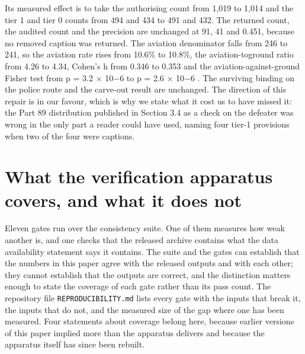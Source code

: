 Its measured effect is to take the authorising count from 1,019 to 1,014 and the tier 1 and tier 0 counts from 494 and 434 to 491 and 432. The returned count, the audited count and the precision are unchanged at 91, 41 and 0.451, because no removed caption was returned. The aviation denominator falls from 246 to 241, so the aviation rate rises from 10.6\% to 10.8\%, the aviation-toground ratio from 4.26 to 4.34, Cohen's h from 0.346 to 0.353 and the aviation-against-ground Fisher test from p = 3.2 $\times$ 10$-$6 to p = 2.6 $\times$ 10$-$6 . The surviving binding on the police route and the carve-out result are unchanged. The direction of this repair is in our favour, which is why we state what it cost us to have missed it: the Part 89 distribution published in Section 3.4 as a check on the defeater was wrong in the only part a reader could have used, naming four tier-1 provisions when two of the four were captions.

\section{What the verification apparatus covers, and what it does not}\label{app:gates}

Eleven gates run over the consistency suite. One of them measures how weak another is, and one checks that the released archive contains what the data availability statement says it contains. The suite and the gates can establish that the numbers in this paper agree with the released outputs and with each other; they cannot establish that the outputs are correct, and the distinction matters enough to state the coverage of each gate rather than its pass count. The repository file \texttt{REPRODUCIBILITY.md} lists every gate with the inputs that break it, the inputs that do not, and the measured size of the gap where one has been measured. Four statements about coverage belong here, because earlier versions of this paper implied more than the apparatus delivers and because the apparatus itself has since been rebuilt.

